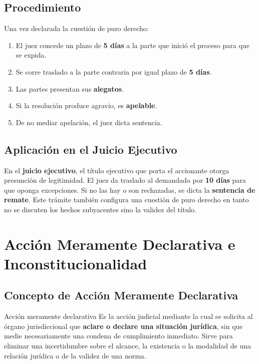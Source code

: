 \documentclass[12pt,oneside]{book}
\begin{document}
\section{Procedimiento}

Una vez declarada la cuestión de puro derecho:

\begin{enumerate}
    \item El juez concede un plazo de \textbf{5 días} a la parte que inició el proceso para que se expida.
    \item Se corre traslado a la parte contraria por igual plazo de \textbf{5 días}.
    \item Las partes presentan sus \textbf{alegatos}.
    \item Si la resolución produce agravio, es \textbf{apelable}.
    \item De no mediar apelación, el juez dicta sentencia.
\end{enumerate}

\section{Aplicación en el Juicio Ejecutivo}

En el \textbf{juicio ejecutivo}, el título ejecutivo que porta el accionante otorga presunción de legitimidad. El juez da traslado al demandado por \textbf{10 días} para que oponga excepciones. Si no las hay o son rechazadas, se dicta la \textbf{sentencia de remate}. Este trámite también configura una cuestión de puro derecho en tanto no se discuten los hechos subyacentes sino la validez del título.

\chapter{Acción Meramente Declarativa e Inconstitucionalidad}

\section{Concepto de Acción Meramente Declarativa}

\begin{definition}{Acción meramente declarativa}
Es la acción judicial mediante la cual se solicita al órgano jurisdiccional que \textbf{aclare o declare una situación jurídica}, sin que medie necesariamente una condena de cumplimiento inmediato. Sirve para eliminar una incertidumbre sobre el alcance, la existencia o la modalidad de una relación jurídica o de la validez de una norma.
\end{definition}
\end{document}
